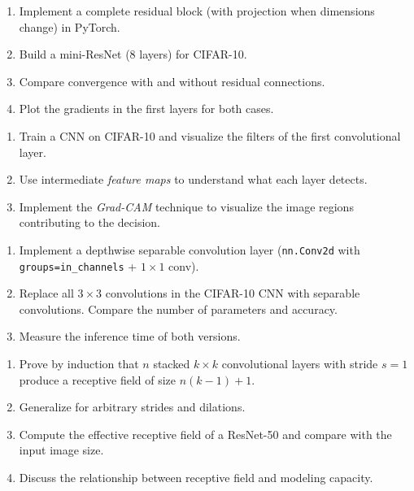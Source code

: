 \begin{exercise}
\begin{enumerate}
  \item Implement a complete residual block (with projection when
    dimensions change) in PyTorch.
  \item Build a mini-ResNet (8 layers) for CIFAR-10.
  \item Compare convergence with and without residual connections.
  \item Plot the gradients in the first layers for both cases.
\end{enumerate}
\end{exercise}

\begin{exercise}
\begin{enumerate}
  \item Train a CNN on CIFAR-10 and visualize the filters of the first
    convolutional layer.
  \item Use intermediate \textit{feature maps} to understand what each
    layer detects.
  \item Implement the \textit{Grad-CAM} technique to visualize the image
    regions contributing to the decision.
\end{enumerate}
\end{exercise}

\begin{exercise}
\begin{enumerate}
  \item Implement a depthwise separable convolution layer
    (\texttt{nn.Conv2d} with \texttt{groups=in\_channels} + $1 \times 1$ conv).
  \item Replace all $3 \times 3$ convolutions in the CIFAR-10 CNN with
    separable convolutions. Compare the number of parameters and
    accuracy.
  \item Measure the inference time of both versions.
\end{enumerate}
\end{exercise}

\begin{exercise}
\begin{enumerate}
  \item Prove by induction that $n$ stacked $k \times k$ convolutional
    layers with stride $s = 1$ produce a receptive field of size
    $n(k - 1) + 1$.
  \item Generalize for arbitrary strides and dilations.
  \item Compute the effective receptive field of a ResNet-50 and compare
    with the input image size.
  \item Discuss the relationship between receptive field and modeling
    capacity.
\end{enumerate}
\end{exercise}
